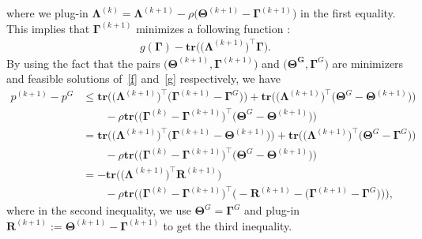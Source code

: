 \documentclass[alpha-refs]{wiley-article}
\begin{document}
where we plug-in $\boldsymbol{\Lambda}^{(k)}=\boldsymbol{\Lambda}^{(k+1)}-\rho\big( \boldsymbol{\Theta}^{(k+1)} - \boldsymbol{\Gamma}^{(k+1)} \big)$ in the first equality.
This implies that $\boldsymbol{\Gamma}^{(k+1)}$ minimizes a following function :
\begin{align} \label{g}
    g(\boldsymbol{\Gamma}) - \textbf{tr} \big( \big( \boldsymbol{\Lambda}^{(k+1)}\big)^{\top} \boldsymbol{\Gamma} \big).
\end{align}
By using the fact that the pairs $\big( \boldsymbol{\Theta}^{(k+1)}, \boldsymbol{\Gamma}^{(k+1)} \big)$ and $\big( \boldsymbol{\Theta^{G}}, \boldsymbol{\Gamma}^{G} \big)$ are minimizers and feasible solutions of~\eqref{f} and~\eqref{g} respectively, we have
\begin{align}
    p^{(k+1)}-p^{G}
    &\leq \textbf{tr} \big( \big( \boldsymbol{\Lambda}^{(k+1)}\big)^{\top} \big( \boldsymbol{\Gamma}^{(k+1)} - \boldsymbol{\Gamma}^{G} \big) \big) + \textbf{tr} \big( \big( \boldsymbol{\Lambda}^{(k+1)}\big)^{\top} \big( \boldsymbol{\Theta}^{G} - \boldsymbol{\Theta}^{(k+1)}  \big) \big) \nonumber \\
    & \qquad - \rho \textbf{tr} \big( \big( \boldsymbol{\Gamma}^{(k)} - \boldsymbol{\Gamma}^{(k+1)} \big)^{\top} \big( \boldsymbol{\Theta}^{G} - \boldsymbol{\Theta}^{(k+1)} \big) \big) \nonumber \\
    &= \textbf{tr} \big( \big( \boldsymbol{\Lambda}^{(k+1)}\big)^{\top} \big( \boldsymbol{\Gamma}^{(k+1)} - \boldsymbol{\Theta}^{(k+1)} \big) \big) + \textbf{tr} \big( \big( \boldsymbol{\Lambda}^{(k+1)}\big)^{\top} \big( \boldsymbol{\Theta}^{G} - \boldsymbol{\Gamma}^{G}  \big) \big) \nonumber \\
    & \qquad - \rho \textbf{tr} \big( \big( \boldsymbol{\Gamma}^{(k)} - \boldsymbol{\Gamma}^{(k+1)} \big)^{\top} \big( \boldsymbol{\Theta}^{G} - \boldsymbol{\Theta}^{(k+1)} \big) \big) \nonumber \\
    &= - \textbf{tr} \big( \big( \boldsymbol{\Lambda}^{(k+1)}\big)^{\top} \boldsymbol{R}^{(k+1)} \big) \nonumber \\
    & \qquad - \rho \textbf{tr} \big( \big( \boldsymbol{\Gamma}^{(k)} - \boldsymbol{\Gamma}^{(k+1)} \big)^{\top} \big( - \boldsymbol{R}^{(k+1)} - \big( \boldsymbol{\Gamma}^{(k+1)} - \boldsymbol{\Gamma}^{G} \big) \big) \big),  \label{Ineq1}
\end{align}
where in the second inequality, we use $\boldsymbol{\Theta}^{G} = \boldsymbol{\Gamma}^{G}$ and plug-in $\boldsymbol{R}^{(k+1)} := \boldsymbol{\Theta}^{(k+1)}-\boldsymbol{\Gamma}^{(k+1)}$ to get the third inequality.
\end{document}
